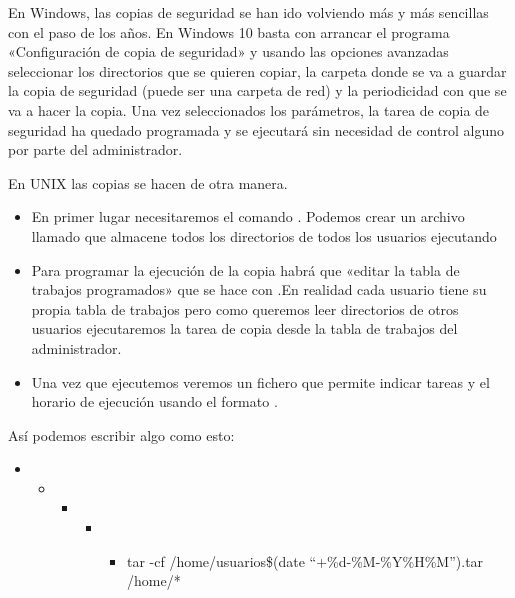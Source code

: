 \documentclass[letterpaper,10pt,spanish]{sphinxmanual}
\begin{document}
En Windows, las copias de seguridad se han ido volviendo más y más sencillas con el paso de los años. En Windows 10 basta con arrancar el programa «Configuración de copia de seguridad» y usando las opciones avanzadas seleccionar los directorios que se quieren copiar, la carpeta donde se va a guardar la copia de seguridad (puede ser una carpeta de red) y la periodicidad con que se va a hacer la copia. Una vez seleccionados los parámetros, la tarea de copia de seguridad ha quedado programada y se ejecutará sin necesidad de control alguno por parte del administrador.

En UNIX las copias se hacen de otra manera.
\begin{itemize}
\item {} 
En primer lugar necesitaremos el comando  . Podemos crear un archivo llamado  que almacene todos los directorios de todos los usuarios ejecutando 

\item {} 
Para programar la ejecución de la copia habrá que «editar la tabla de trabajos programados» que se hace con  .En realidad cada usuario tiene su propia tabla de trabajos pero como queremos leer directorios de otros usuarios ejecutaremos la tarea de copia desde la tabla de trabajos del administrador.

\item {} 
Una vez que ejecutemos  veremos un fichero que permite indicar tareas y el horario de ejecución usando el formato  .

\end{itemize}

Así podemos escribir algo como esto:
\begin{itemize}
\item {} \begin{itemize}
\item {} \begin{itemize}
\item {} \begin{itemize}
\item {} \begin{itemize}
\item {} 
tar -cf /home/usuarios\$(date “+\%d-\%M-\%Y\%H\%M”).tar /home/*

\end{itemize}

\end{itemize}

\end{itemize}

\end{itemize}

\end{itemize}
\end{document}
